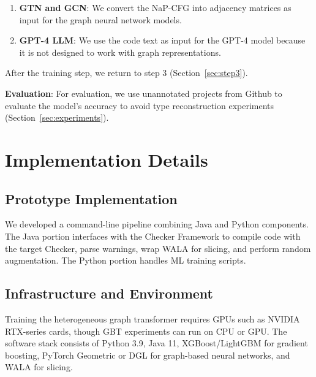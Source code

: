 \documentclass[acmsmall,screen,review,anonymous]{acmart}
\newcommand{\cf}{Checker Framework\xspace}
\begin{document}
\begin{enumerate}
    \item \textbf{GTN and GCN}: We convert the NaP-CFG into adjacency matrices as input for the graph neural network models.
    
    \item \textbf{GPT-4 LLM}: We use the code text as input for the GPT-4 model because it is not designed to work with graph representations.
\end{enumerate}

After the training step, we return to step 3 (Section~\ref{sec:step3}).

\textbf{Evaluation}: For evaluation, we use unannotated projects from Github to evaluate the model's accuracy to avoid type reconstruction experiments (Section~\ref{sec:experiments}).

\section{Implementation Details}
\label{sec:implementation}

\subsection{Prototype Implementation}
\label{sec:prototype}

We developed a command-line pipeline combining Java and Python components. The Java portion interfaces with the \cf to compile code with the target Checker, parse warnings, wrap WALA for slicing, and perform random augmentation. The Python portion handles ML training scripts.

\subsection{Infrastructure and Environment}
\label{sec:infrastructure}

Training the heterogeneous graph transformer requires GPUs such as NVIDIA RTX-series cards, though GBT experiments can run on CPU or GPU. The software stack consists of Python 3.9, Java 11, XGBoost/LightGBM for gradient boosting, PyTorch Geometric or DGL for graph-based neural networks, and WALA for slicing.

\end{document}

